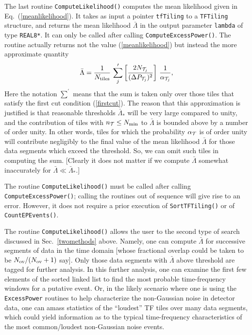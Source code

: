 The last routine \verb+ComputeLikelihood()+ computes the mean likelihood given
in Eq.\ (\ref{meanlikelihood}).  It takes as input a pointer \verb+tfTiling+
to a \verb+TFTiling+ structure, and returns the mean likelihood ${\bar
\Lambda}$ in the output parameter \verb+lambda+ of type \verb+REAL8*+.  It can
only be called after calling \verb+ComputeExcessPower()+.  The routine
actually returns not the value (\ref{meanlikelihood}) but instead the more
approximate quantity  
\begin{equation}
{\bar \Lambda} = {1 \over N_{\rm tiles}} \, \sum_j^\prime \left[{2 N_{{\cal
T}_j} \over (\Delta P_{{\cal T}_j})^2 } \right] \, {1 \over
\alpha_{{\cal T}_j}},
\label{meanlikelihood1}
\end{equation}
Here the notation $\sum^\prime$ means that the sum is taken only over those
tiles that satisfy the first cut condition (\ref{firstcut}).  The reason that
this approximation is justified is that reasonable thresholds ${\bar
\Lambda}_*$ will be very large compared to unity, and the contribution of
tiles with $n_{\cal T} \le N_{\rm min}$ to ${\bar \Lambda}$ is bounded above
by a number of order unity.  In other words, tiles for which the probability
$\alpha_{\cal T}$ is of order unity will contribute negligibly to the final
value of the mean likelihood ${\bar \Lambda}$ for those data segments which
exceed the threshold.  So, we can omit such tiles in computing the sum.
[Clearly it does not matter if we compute ${\bar \Lambda}$ somewhat
inaccurately for ${\bar \Lambda} \ll {\bar \Lambda}_*$.] 

The routine \verb+ComputeLikelihood()+ must be called after calling
\verb+ComputeExcessPower()+; calling the routines out of sequence will give
rise to an error.  However, it does not require a prior execution of
\verb+SortTFTiling()+ or of \verb+CountEPEvents()+.  

The routine \verb+ComputeLikelihood()+ allows the user to the second type of
search discussed in Sec.\ \ref{twomethods} above.  Namely, one can compute
${\bar \Lambda}$ for successive segments of data in the time domain [whose
fractional overlap could be taken to be $N_{\rm ov} / (N_{\rm ov} +1)$ say].
Only those data segments with ${\bar \Lambda}$ above threshold are tagged for
further analysis.  In this further analysis, one can examine the first few
elements of the sorted linked list to find the most probable time-frequency
windows for a putative event.  Or, in the likely scenario where one is using
the \verb+ExcessPower+ routines to help characterize the non-Gaussian noise in
detector data, one can amass statistics of the ``loudest'' TF tiles over many
data segments, which could yield information as to the typical time-frequency
characteristics of the most common/loudest non-Gaussian noise events.

